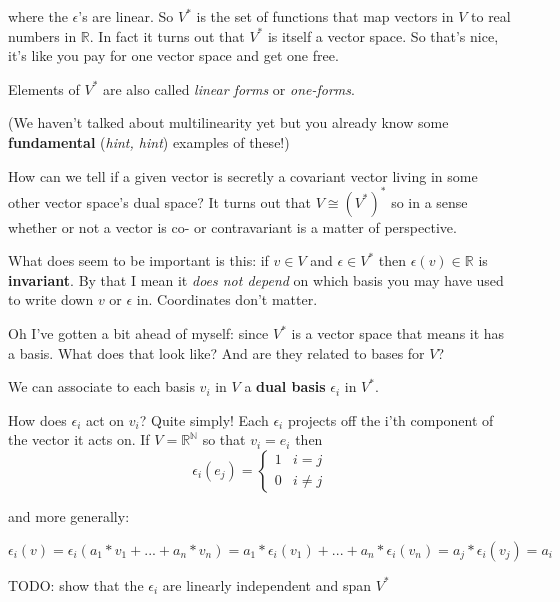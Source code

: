 \documentclass{article}
\begin{document}
where the $\epsilon$'s are linear. So $V^{*}$ is the set of functions that map
vectors in $V$ to real numbers in $\mathbb{R}$. In fact it turns out that
$V^{*}$ is itself a vector space. So that's nice, it's like you pay for one
vector space and get one free.

Elements of $V^{*}$ are also called \textsl{linear forms} or \textsl{one-forms}.

(We haven't talked about multilinearity yet but you already know some
\textbf{fundamental} (\textsl{hint, hint}) examples of these!)

How can we tell if a given vector is secretly a covariant vector living in some
other vector space's dual space? It turns out that $V \cong (V^{*})^{*}$ so in a
sense whether or not a vector is co- or contravariant is a matter of
perspective.

What does seem to be important is this: if $v \in V$ and $\epsilon \in V^{*}$
then $\epsilon(v) \in \mathbb{R}$ is \textbf{invariant}. By that I mean it
\textsl{does not depend} on which basis you may have used to write down $v$ or
$\epsilon$ in. Coordinates don't matter.

Oh I've gotten a bit ahead of myself: since $V^{*}$ is a vector space that means
it has a basis. What does that look like? And are they related to bases for $V$?

We can associate to each basis $v_{i}$ in $V$ a \textbf{dual basis}
$\epsilon_{i}$ in $V^{*}$.

How does $\epsilon_{i}$ act on $v_{i}$? Quite simply! Each $\epsilon_{i}$
projects off the i'th component of the vector it acts on. If $V =
\mathbb{R^{N}}$ so that $v_{i} = e_{i}$ then
\begin{equation*}
  \epsilon_{i}(e_{j}) = \begin{cases}
    1 & i = j\\
    0 & i \neq j
  \end{cases}
\end{equation*}

and more generally:

\begin{equation*}
  \epsilon_{i}(v) = \epsilon_{i}(a_{1} * v_{1} + ... + a_{n} * v_{n}) = a_{1} * \epsilon_{i}(v_{1}) + ... + a_{n} * \epsilon_{i}(v_{n}) = a_{j} * \epsilon_{i}(v_{j}) = a_{i}
\end{equation*}

TODO: show that the $\epsilon_{i}$ are linearly independent and span $V^{*}$
\end{document}
